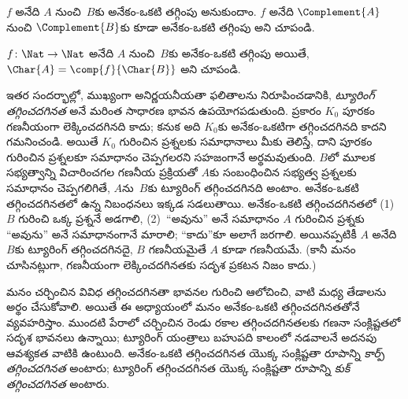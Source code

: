 \documentclass[../../../include/open-logic-section]{subfiles}
\begin{document}
\begin{prob}
$f$ అనేది $A$ నుంచి~$B$కు అనేకం-ఒకటి తగ్గింపు అనుకుందాం.
$f$ అనేది $\Complement{A}$ నుంచి $\Complement{B}$కు కూడా
అనేకం-ఒకటి తగ్గింపు అని చూపండి.
\end{prob}

\begin{prob}
$f\colon\Nat\to\Nat$ అనేది $A$ నుంచి~$B$కు అనేకం-ఒకటి తగ్గింపు
అయితే, $\Char{A}=\comp{f}{\Char{B}}$ అని చూపండి.
\end{prob}

\begin{digress}
ఇతర సందర్భాల్లో, ముఖ్యంగా అనిర్ణయనీయతా ఫలితాలను నిరూపించడానికి,
\emph{ట్యూరింగ్ తగ్గించదగినత} అనే మరింత సాధారణ భావన ఉపయోగపడుతుంది.
 ప్రకారం $K_0$ పూరకం గణనీయంగా లెక్కించదగినది
కాదు; కనుక అది $K_0$కు అనేకం-ఒకటిగా తగ్గించదగినది కాదని గమనించండి.
అయితే $K_0$ గురించిన ప్రశ్నలకు సమాధానాలు మీకు తెలిస్తే, దాని పూరకం
గురించిన ప్రశ్నలకూ సమాధానం చెప్పగలరని సహజంగానే అర్థమవుతుంది.
$B$లో మూలక సభ్యత్వాన్ని విచారించగల గణనీయ ప్రక్రియతో $A$కు
సంబంధించిన సభ్యత్వ ప్రశ్నలకు సమాధానం చెప్పగలిగితే, $A$ను~$B$కు ట్యూరింగ్
తగ్గించదగినది అంటాం. అనేకం-ఒకటి తగ్గించదగినతలో ఉన్న నిబంధనలు ఇక్కడ సడలుతాయి.
అనేకం-ఒకటి తగ్గించదగినతలో (1)~$B$ గురించి ఒక్క ప్రశ్ననే అడగాలి,
(2)~``అవును'' అనే సమాధానం $A$ గురించిన ప్రశ్నకు ``అవును'' అనే
సమాధానంగానే మారాలి; ``కాదు''కూ అలాగే జరగాలి. అయినప్పటికీ $A$ అనేది
$B$కు ట్యూరింగ్ తగ్గించదగినదై, $B$ గణనీయమైతే $A$ కూడా గణనీయమే.
(కానీ మనం చూసినట్లుగా, గణనీయంగా లెక్కించదగినతకు సదృశ ప్రకటన నిజం
కాదు.)

మనం చర్చించిన వివిధ తగ్గించదగినతా భావనల గురించి ఆలోచించి, వాటి మధ్య
తేడాలను అర్థం చేసుకోవాలి. అయితే ఈ అధ్యాయంలో మనం అనేకం-ఒకటి
తగ్గించదగినతతోనే వ్యవహరిస్తాం. ముందటి పేరాలో చర్చించిన
రెండు రకాల తగ్గించదగినతలకు గణనా సంక్లిష్టతలో సదృశ భావనలు ఉన్నాయి;
ట్యూరింగ్ యంత్రాలు బహుపది కాలంలో నడవాలనే అదనపు ఆవశ్యకత వాటికి ఉంటుంది.
అనేకం-ఒకటి తగ్గించదగినత యొక్క సంక్లిష్టతా రూపాన్ని \emph{కార్ప్
తగ్గించదగినత} అంటారు; ట్యూరింగ్ తగ్గించదగినత యొక్క సంక్లిష్టతా
రూపాన్ని \emph{కుక్ తగ్గించదగినత} అంటారు.
\end{digress}
\end{document}
